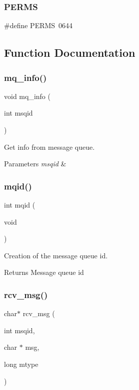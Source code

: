 \mbox{\label{mq_8h_afee0dce2271f56a18b4656548b2de8cc}} 
\subsubsection{P\+E\+R\+MS}
{\footnotesize\ttfamily \#define P\+E\+R\+MS~0644}



\subsection{Function Documentation}
\mbox{\label{mq_8h_abd23771ce4522444ca0cbdad8413515d}} 
\subsubsection{mq\+\_\+info()}
{\footnotesize\ttfamily void mq\+\_\+info (\begin{DoxyParamCaption}\item[{int}]{msqid }\end{DoxyParamCaption})}



Get info from message queue. 


\begin{DoxyParams}{Parameters}
{\em msqid} & \\
\hline
\end{DoxyParams}
\mbox{\label{mq_8h_a09c20d0a7874e29781d83b7243f58582}} 
\subsubsection{mqid()}
{\footnotesize\ttfamily int mqid (\begin{DoxyParamCaption}\item[{void}]{ }\end{DoxyParamCaption})}



Creation of the message queue id. 

\begin{DoxyReturn}{Returns}
Message queue id 
\end{DoxyReturn}
\mbox{\label{mq_8h_a07daba13b107a4b924dafaa1acf84235}} 
\subsubsection{rcv\+\_\+msg()}
{\footnotesize\ttfamily char$\ast$ rcv\+\_\+msg (\begin{DoxyParamCaption}\item[{int}]{msqid,  }\item[{char $\ast$}]{msg,  }\item[{long}]{mtype }\end{DoxyParamCaption})}




